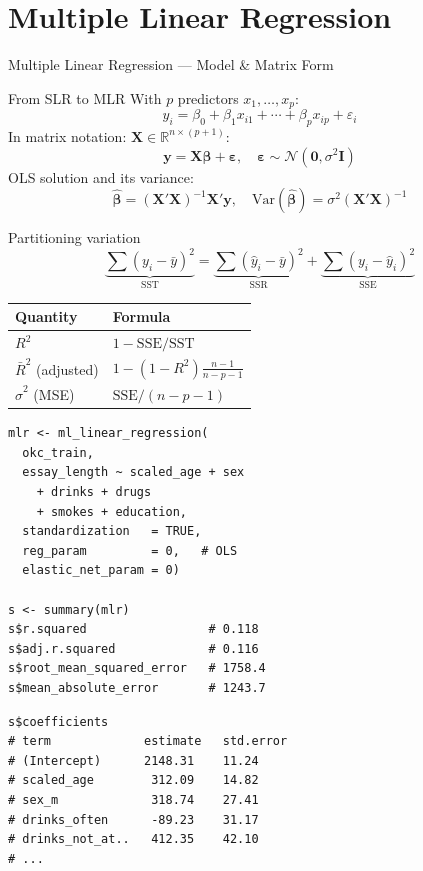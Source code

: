 \documentclass[11pt, aspectratio=169]{beamer}
\begin{document}
\section{Multiple Linear Regression}

\begin{frame}{Multiple Linear Regression --- Model \& Matrix Form}
	\begin{block}{From SLR to MLR}
				With $p$ predictors $x_1,\ldots,x_p$:
				\[
				y_i = \beta_0 + \beta_1 x_{i1} + \cdots + \beta_p x_{ip}
				+ \varepsilon_i
				\]
				In matrix notation:
				$\mathbf{X} \in \mathbb{R}^{n\times(p+1)}$:
				\[
				\mathbf{y} = \mathbf{X}\bm\beta + \bm\varepsilon,
				\quad \bm\varepsilon \sim \mathcal{N}(\mathbf{0}, \sigma^2\mathbf{I})
				\]
				OLS solution and its variance:
				\[
				\hat{\bm\beta} = (\mathbf{X}'\mathbf{X})^{-1}\mathbf{X}'\mathbf{y},
				\quad
				\mathrm{Var}(\hat{\bm\beta}) = \sigma^2(\mathbf{X}'\mathbf{X})^{-1}
				\]
			\end{block}
			\begin{block}{Partitioning variation}
				\[
				\underbrace{\sum(y_i-\bar y)^2}_{\text{SST}}
				= \underbrace{\sum(\hat y_i-\bar y)^2}_{\text{SSR}}
				+ \underbrace{\sum(y_i-\hat y_i)^2}_{\text{SSE}}
				\]
				\footnotesize
				\begin{tabular}{ll}
					\toprule
					\textbf{Quantity} & \textbf{Formula}\\
					\midrule
					$R^2$ & $1 - \mathrm{SSE}/\mathrm{SST}$\\
					$\bar R^2$ (adjusted) & $1-(1-R^2)\frac{n-1}{n-p-1}$\\
					$\hat\sigma^2$ (MSE)  & $\mathrm{SSE}/(n-p-1)$\\
					\bottomrule
				\end{tabular}
			\end{block}
		\begin{lstlisting}[title={MLR fit on OkCupid (therinspark.com §4.3)}]
mlr <- ml_linear_regression(
  okc_train,
  essay_length ~ scaled_age + sex
    + drinks + drugs
    + smokes + education,
  standardization   = TRUE,
  reg_param         = 0,   # OLS
  elastic_net_param = 0)

s <- summary(mlr)
s$r.squared                 # 0.118
s$adj.r.squared             # 0.116
s$root_mean_squared_error   # 1758.4
s$mean_absolute_error       # 1243.7
			\end{lstlisting}
			\begin{lstlisting}[title={Coefficient table}]
s$coefficients
# term             estimate   std.error
# (Intercept)      2148.31    11.24
# scaled_age        312.09    14.82
# sex_m             318.74    27.41
# drinks_often      -89.23    31.17
# drinks_not_at..   412.35    42.10
# ...
			\end{lstlisting}
		\end{frame}
\end{document}
